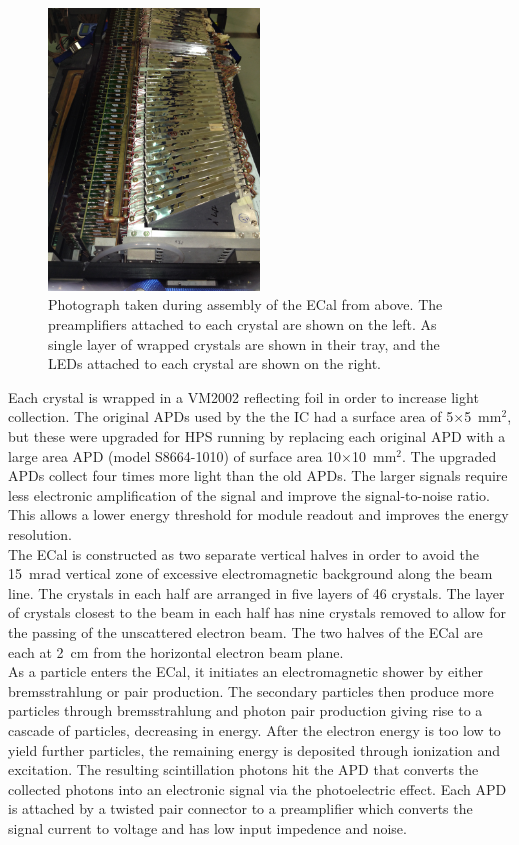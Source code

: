 \begin{figure}[h]
  \centering
      \includegraphics[width=0.5\textwidth]{pics/experiment/ecalAssembly1.png}
  \caption[Photograph of ECal crystals during assembly]{Photograph taken during assembly of the ECal from above. The preamplifiers attached to each crystal are shown on the left. As single layer of wrapped crystals are shown in their tray, and the LEDs attached to each crystal are shown on the right.}
  \label{Figure:ecalAssembly1}
\end{figure}

Each crystal is wrapped in a VM2002 reflecting foil in order to increase light collection. The original APDs used by the the IC had a surface area of 5$\times$5~mm$^2$, but these were upgraded for HPS running by replacing each original APD with a large area APD (model S8664-1010) of surface area 10$\times$10~mm$^2$. The upgraded APDs collect four times more light than the old APDs. The larger signals require less electronic amplification of the signal and improve the signal-to-noise ratio. This allows a lower energy threshold for module readout and improves the energy resolution. \\
\indent The ECal is constructed as two separate vertical halves in order to avoid the 15~mrad vertical zone of excessive electromagnetic background along the beam line. The crystals in each half are arranged in five layers of 46 crystals. The layer of crystals closest to the beam in each half has nine crystals removed to allow for the passing of the unscattered electron beam. The two halves of the ECal are each at 2~cm from the  horizontal electron beam plane.\\
\indent As a particle enters the ECal, it initiates an electromagnetic shower by either bremsstrahlung or pair production. The secondary particles then produce more particles through bremsstrahlung and photon pair production giving rise to a cascade of particles, decreasing in energy. After the electron energy is too low to yield further particles, the remaining energy is deposited through ionization and excitation. The resulting scintillation photons hit the APD that converts the collected photons into an electronic signal via the photoelectric effect. Each APD is attached by a twisted pair connector to a preamplifier which converts the signal current to voltage and has low input impedence and noise.  

